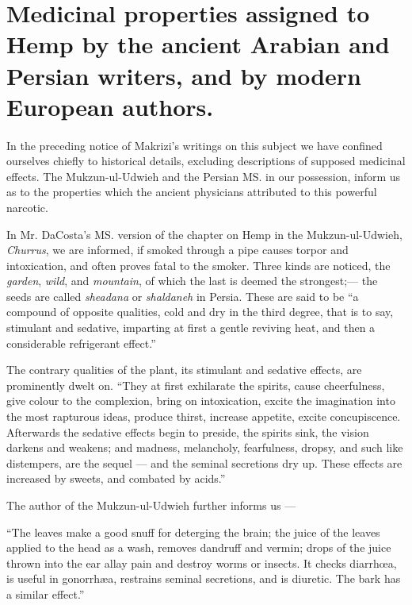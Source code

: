 \documentclass[a4paper, 11pt, oneside, polutonikogreek, english]{article}
\begin{document}
\section{Medicinal properties assigned to Hemp by the ancient Arabian and Persian writers, and by modern European authors.}
\paragraph{}
In the preceding notice of Makrizi's writings on this subject we have confined ourselves chiefly to historical details, excluding descriptions of supposed medicinal effects. The Mukzun-ul-Udwieh and the Persian MS. in our possession, inform us as to the properties which the ancient physicians attributed to this powerful narcotic.

In Mr. DaCosta's MS. version of the chapter on Hemp in the Mukzun-ul-Udwieh, \emph{Churrus}, we are informed, if smoked through a pipe causes torpor and intoxication, and often proves fatal to the smoker. Three kinds are noticed, the \emph{garden}, \emph{wild}, and \emph{mountain}, of which the last is deemed the strongest;--- the seeds are called \emph{sheadana} or \emph{shaldaneh} in Persia. These are said to be ``a compound of opposite qualities, cold and dry in the third degree, that is to say, stimulant and sedative, imparting at first a gentle reviving heat, and then a considerable refrigerant effect.''

The contrary qualities of the plant, its stimulant and sedative effects, are prominently dwelt on. ``They at first exhilarate the spirits, cause cheerfulness, give colour to the complexion, bring on intoxication, excite the imagination into the most rapturous ideas, produce thirst, increase appetite, excite concupiscence. Afterwards the sedative effects begin to preside, the spirits sink, the vision darkens and weakens; and madness, melancholy, fearfulness, dropsy, and such like distempers, are the sequel --- and the seminal secretions dry up. These effects are increased by sweets, and combated by acids.''

The author of the Mukzun-ul-Udwieh further informs us ---

``The leaves make a good snuff for deterging the brain; the juice of the leaves applied to the head as a wash, removes dandruff and vermin; drops of the juice thrown into the ear allay pain and destroy worms or insects. It checks diarrhœa, is useful in gonorrhæa, restrains seminal secretions, and is diuretic. The bark has a similar effect.''
\end{document}
